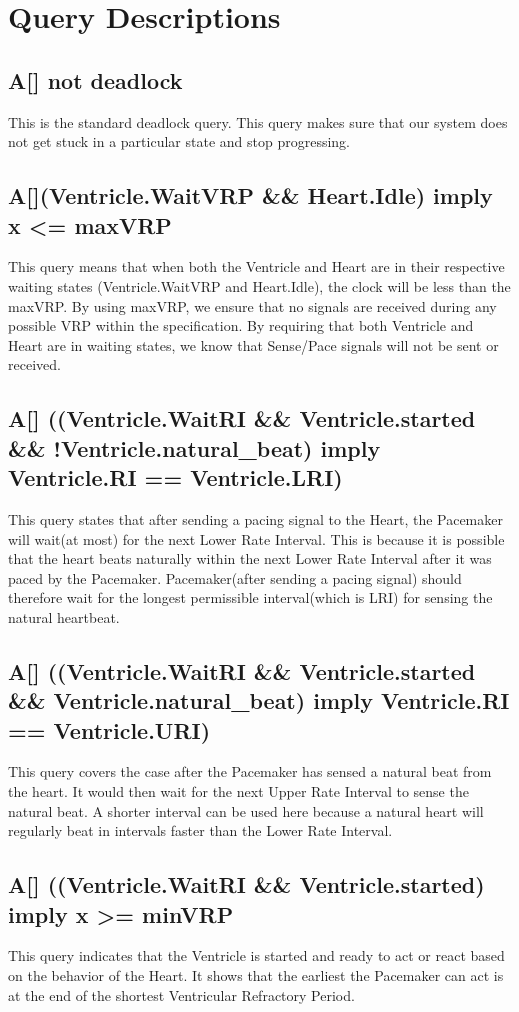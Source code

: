 \documentclass[10pt]{article}
\begin{document}
\section{Query Descriptions}


	\subsection{A[] not deadlock}
	This is the standard deadlock query. This query makes sure that our system does not get stuck in a particular state and stop progressing.


	\subsection{A[](Ventricle.WaitVRP \&\& Heart.Idle) imply x <= maxVRP}

	This query means that when both the Ventricle and Heart are in their respective waiting states (Ventricle.WaitVRP and Heart.Idle), the clock will be less than the maxVRP. By using maxVRP, we ensure that no signals are received during any possible VRP within the specification. By requiring that both Ventricle and Heart are in waiting states, we know that Sense/Pace signals will not be sent or received.

	\subsection{A[] ((Ventricle.WaitRI \&\& Ventricle.started \&\& !Ventricle.natural\_beat) imply Ventricle.RI == Ventricle.LRI)}

	This query states that after sending a pacing signal to the Heart, the Pacemaker will wait(at most) for the next Lower Rate Interval. This is because it is possible that the heart beats naturally within the next Lower Rate Interval after it was paced by the Pacemaker. Pacemaker(after sending a pacing signal) should therefore wait for the longest permissible interval(which is LRI) for sensing the natural heartbeat.

	\subsection{A[] ((Ventricle.WaitRI \&\& Ventricle.started \&\& Ventricle.natural\_beat) imply Ventricle.RI == Ventricle.URI)}

	This query covers the case after the Pacemaker has sensed a natural beat from the heart. It would then wait for the next Upper Rate Interval to sense the natural beat. A shorter interval can be used here because a natural heart will regularly beat in intervals faster than the Lower Rate Interval.

	\subsection{A[] ((Ventricle.WaitRI \&\& Ventricle.started) imply x >= minVRP}

	This query indicates that the Ventricle is started and ready to act or react based on the behavior of the Heart. It shows that the earliest the Pacemaker can act is at the end of the shortest Ventricular Refractory Period.


	
\end{document}
